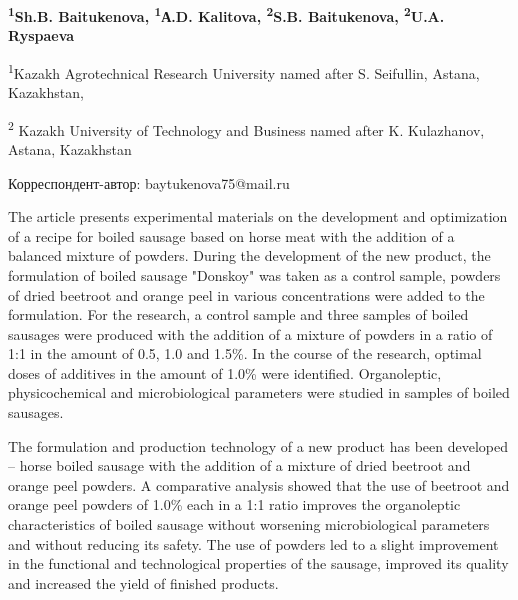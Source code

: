 
\begin{articleheader}

{\bfseries
\textsuperscript{1}Sh.B. Baitukenova\textsuperscript{\envelope },
\textsuperscript{1}А.D. Kalitova,
\textsuperscript{2}S.B. Baitukenova,
\textsuperscript{2}U.A. Ryspaeva
}
\end{articleheader}

\begin{affiliation}
\textsuperscript{1}Kazakh Agrotechnical Research University named after
S. Seifullin, Astana, Kazakhstan,

\textsuperscript{2} Kazakh University of Technology and Business named
after K. Kulazhanov, Astana, Kazakhstan

\raggedright \textsuperscript{\envelope }Корреспондент-автор: baytukenova75@mail.ru
\end{affiliation}

The article presents experimental materials on the development and
optimization of a recipe for boiled sausage based on horse meat with the
addition of a balanced mixture of powders. During the development of the
new product, the formulation of boiled sausage "Donskoy" was taken as a
control sample, powders of dried beetroot and orange peel in various
concentrations were added to the formulation. For the research, a
control sample and three samples of boiled sausages were produced with
the addition of a mixture of powders in a ratio of 1:1 in the amount of
0.5, 1.0 and 1.5\%. In the course of the research, optimal doses of
additives in the amount of 1.0\% were identified. Organoleptic,
physicochemical and microbiological parameters were studied in samples
of boiled sausages.

The formulation and production technology of a new product has been
developed -- horse boiled sausage with the addition of a mixture of
dried beetroot and orange peel powders. A comparative analysis showed
that the use of beetroot and orange peel powders of 1.0\% each in a 1:1
ratio improves the organoleptic characteristics of boiled sausage
without worsening microbiological parameters and without reducing its
safety. The use of powders led to a slight improvement in the functional
and technological properties of the sausage, improved its quality and
increased the yield of finished products.

